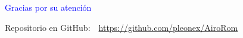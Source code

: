
\section{}
\begin{frame}{}
    \begin{center}
        \Huge{}\textcolor{Blue}{Gracias por su atención}
    \end{center}

    \vfill
    \footnotesize{}Repositorio en GitHub:~~\url{https://github.com/pleonex/AiroRom}
\end{frame}
